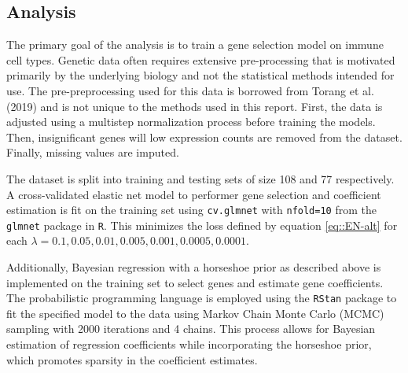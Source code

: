 \documentclass[
	a4paper, %
	10pt, %
	unnumberedsections, %
	twoside, %
]{LTJournalArticle}
\newcommand{\1}{\mathbbm{1}}
\begin{document}

\subsection{Analysis}

The primary goal of the analysis is to train a gene selection model on immune cell types. Genetic data often requires extensive pre-processing that is motivated primarily by the underlying biology and not the statistical methods intended for use. The pre-preprocessing used for this data is borrowed from Torang et al. (2019) and is not unique to the methods used in this report. First, the data is adjusted using a multistep normalization process before training the models. Then, insignificant genes will low expression counts are removed from the dataset. Finally, missing values are imputed.

The dataset is split into training and testing sets of size 108 and 77 respectively. A cross-validated elastic net model to performer gene selection and coefficient estimation is fit on the training set using \verb|cv.glmnet| with \verb|nfold=10| from the \verb|glmnet| package in \verb|R|. This minimizes the loss defined by equation \ref{eq::EN-alt} for each $\lambda = 0.1, 0.05, 0.01, 0.005, 0.001, 0.0005, 0.0001$. 

Additionally, Bayesian regression with a horseshoe prior as described above is implemented on the training set to select genes and estimate gene coefficients. The probabilistic programming language is employed using the \verb|RStan| package to fit the specified model to the data using Markov Chain Monte Carlo (MCMC) sampling with 2000 iterations and 4 chains. This process allows for Bayesian estimation of regression coefficients while incorporating the horseshoe prior, which promotes sparsity in the coefficient estimates. 
\end{document}
